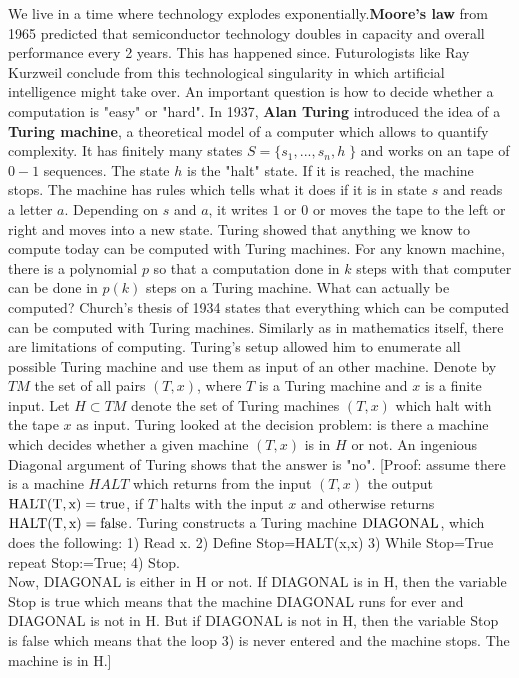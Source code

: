 \documentclass[12pt]{amsart}
\begin{document}
We live in a time where technology explodes exponentially.{\bf Moore's law} from 1965 predicted that semiconductor
technology doubles in capacity and overall performance every 2 years. This has happened since. 
Futurologists like Ray Kurzweil conclude from this  technological singularity in which artificial intelligence 
might take over. An important question is how to decide whether a computation is "easy" or "hard".
In 1937, {\bf Alan Turing} introduced the idea of a {\bf Turing machine}, 
a theoretical model of a computer which allows to quantify complexity.
It has finitely many states $S=\{s_1,...,s_n,h \; \}$ and works on an tape of $0-1$ sequences. The state $h$ is the 
"halt" state. If it is reached, the machine stops. The machine has rules
which tells what it does if it is in state $s$ and reads a letter $a$. Depending on $s$ and $a$, it writes $1$ or $0$
or moves the tape to the left or right and moves into a new state. Turing showed
that anything we know to compute today can be computed with Turing machines. For any known machine, there is a polynomial
$p$ so that a computation done in $k$ steps with that computer can be done in $p(k)$ steps on a Turing machine. 
What can actually be computed? {\rm Church's thesis} of 1934 states that everything which can be computed can 
be computed with Turing machines. Similarly as in mathematics itself, there are limitations of computing. Turing's 
setup allowed him to enumerate all possible Turing machine and use them as input of an other machine. Denote by $TM$ the
set of all pairs $(T,x)$, where $T$ is a Turing machine and $x$ is a finite input. Let $H \subset TM$ denote
the set of Turing machines $(T,x)$ which halt with the tape $x$ as input. Turing looked at the decision problem: is there a machine
which decides whether a given machine $(T,x)$ is in $H$ or not. An ingenious Diagonal argument of Turing shows that the
answer is "no". [Proof: assume there is a machine 
$HALT$ which returns from the input $(T,x)$ the output ${\rm HALT(T,x)=true}$, if $T$ halts with the input $x$ and
otherwise returns ${\rm HALT(T,x)=false}$. Turing constructs a Turing machine ${\rm DIAGONAL}$, which 
does the following: 1) Read x. 2) Define Stop=HALT(x,x) 3) While Stop=True repeat Stop:=True; 4) Stop. \\
Now, DIAGONAL is either in H or not. If DIAGONAL is in H, then the variable Stop is true which means that the machine
DIAGONAL runs for ever and DIAGONAL is not in H. But if DIAGONAL is not in H, then the variable Stop is false which 
means that the loop 3) is never entered and the machine stops. The machine is in H.] \\
\end{document}
